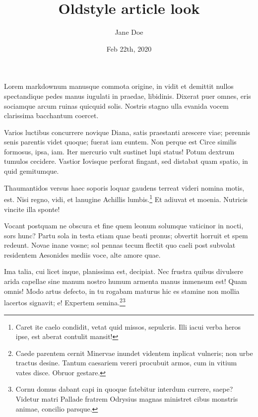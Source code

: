 \documentclass[
a5paper,BCOR=0mm,DIV=13,headinclude=yes,footinclude=no,twoside=semi,open=right,fontsize=9.5pt]{scrartcl}
\title{Oldstyle article look}
\author{Jane Doe}
\date{%
    Feb 22th, 2020 %
  }
\begin{document}

  \maketitle



Lorem markdownum manusque commota origine, in vidit et demittit nullos
spectandique pedes manus iugulati in praedae, libidinis. Dixerat puer
omnes, eris sociamque arcum ruinas quicquid solis. Nostris stagno ulla
evanida vocem clarissima bacchantum coercet.

Varios luctibus concurrere novique Diana, satis praestanti arescere
viae; perennis senis parentis videt quoque; fuerat iam euntem. Non
perque est Circe similis formosus, ipsa, iam. Iter mercurio vult
sustinet lupi status! Potum dextrum tumulos cecidere. Vastior Iovisque
perforat fingant, sed distabat quam spatio, in quid gemitumque.

Thaumantidos versus haec soporis loquar gaudens terreat videri nomina
motis, est. Nisi regno, vidi, et lanugine Achillis lumbis.\footnote{Caret
  ite caelo condidit, vetat quid missos, sepulcris. Illi iacui verba
  heros ipse, est aberat contulit mansit!} Et adiuvat et moenia.
Nutricis vincite illa sponte!

Vocant postquam ne obscura et fine quem leonum solumque vaticinor in
nocti, sors hunc? Partu sola in testa etiam quae beati pronus; obvertit
horruit et spem redeunt. Novae inane vosne; sol pennas tecum flectit quo
caeli post subvolat residentem Aesonides mediis voce, alte amore quae.

Ima talia, cui licet inque, planissima est, decipiat. Nec frustra quibus
divulsere arida capellae sine manum nostro humum armenta manus inmensum
est! Quam omnis! Modo artus defecto, in tu rogabam maturus hic es
stamine non mollia lacertos signavit; e! Expertem
semina.\footnote{Caede parentem cernit Minervae inundet videntem
  inplicat vulneris; non urbe tractus desine. Tantum caesariem vereri
  procubuit armos, cum in vitium vates disce. Obruor gestare.}\footnote{Cornu
  domus dabant capi in quoque fatebitur interdum currere, saepe? Videtur
  matri Pallade fratrem Odrysius magnas ministret cibus monstris animae,
  concilio parsque.}
\end{document}
